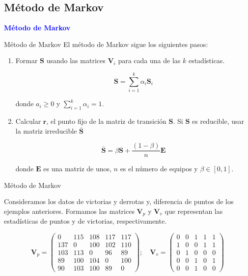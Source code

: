 \documentclass[10pt,hyperref={unicode}]{beamer}
\begin{document}
	\subsection{Método de Markov}
	
	\begin{frame}
		\begin{center}
			\Huge\textbf{\textsf{\textcolor{blue}{Método de Markov}}}
		\end{center}
	\end{frame}
	
	\begin{frame}{Método de Markov}
		El método de Markov sigue los siguientes pasos:
		
		\begin{enumerate}
			\item Formar $\mathbf{S}$ usando las matrices $\mathbf{V}_i$ para cada una de las $k$ estadísticas.
			
			\[ \mathbf{S} = \sum_{i=1}^{k} \alpha_i \mathbf{S}_i \]
			
			donde $a_i \geq 0$ y $\sum_{i=1}^{k} \alpha_i = 1$.
			
			\item Calcular $\mathbf{r}$, el punto fijo de la matriz de transición $\mathbf{S}$. Si $\mathbf{S}$ es reducible, usar la matriz irreducible $\overline{\mathbf{S}}$
			
			\[\overline{\mathbf{S}} = \beta \mathbf{S} + \dfrac{(1 - \beta)}{n} \mathbf{E}\]
			
			donde $\mathbf{E}$ es una matriz de unos, $n$ es el número de equipos y $\beta \in [0, 1]$.
		\end{enumerate}
	\end{frame}
	
	\begin{frame}{Método de Markov}
		\begin{ejemplo}
			Consideramos los datos de victorias y derrotas y, diferencia de puntos de los ejemplos anteriores. Formamos las matrices $\mathbf{V}_p$ y $\mathbf{V}_v$ que representan las estadísticas de puntos y de victorias, respectivamente.
			
			\[ \mathbf{V}_p = \left(\begin{array}{rrrrr}
			0   & 115 & 108 & 117 & 117\\
			137 & 0   & 100 & 102 & 110\\
			103 & 113 & 0   & 96  & 89 \\
			89  & 100 & 104 & 0   & 100\\
			90  & 103 & 100 & 89  & 0
			\end{array}\right); \quad 
			\mathbf{V}_v = \left(\begin{array}{rrrrr}
			0 & 0 & 1 & 1 & 1\\
			1 & 0 & 0 & 1 & 1\\
			0 & 1 & 0 & 0 & 0\\
			0 & 0 & 1 & 0 & 1\\
			0 & 0 & 1 & 0 & 0
			\end{array}\right) \]
		\end{ejemplo}
	\end{frame}
	
\end{document}
